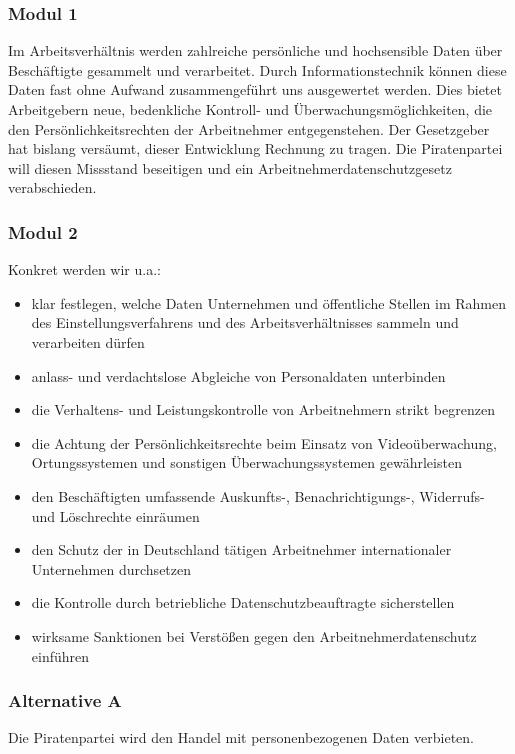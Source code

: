 \label{datenschutz:arbeitnehmer}
\subsubsection{Modul 1}
\abstimmung
Im Arbeitsverhältnis werden zahlreiche persönliche und hochsensible Daten über Beschäftigte gesammelt und verarbeitet. Durch Informationstechnik können diese Daten fast ohne Aufwand zusammengeführt uns ausgewertet werden. Dies bietet Arbeitgebern neue, bedenkliche Kontroll- und Überwachungsmöglichkeiten, die den Persönlichkeitsrechten der Arbeitnehmer entgegenstehen. Der Gesetzgeber hat bislang versäumt, dieser Entwicklung Rechnung zu tragen. Die Piratenpartei will diesen Missstand beseitigen und ein Arbeitnehmerdatenschutzgesetz verabschieden.

\subsubsection{Modul 2}
\abstimmung
Konkret werden wir u.a.:
\begin{itemize}
\item klar festlegen, welche Daten Unternehmen und öffentliche Stellen im Rahmen des Einstellungsverfahrens und des Arbeitsverhältnisses sammeln und verarbeiten dürfen
\item anlass- und verdachtslose Abgleiche von Personaldaten unterbinden
\item die Verhaltens- und Leistungskontrolle von Arbeitnehmern strikt begrenzen
\item die Achtung der Persönlichkeitsrechte beim Einsatz von Videoüberwachung, Ortungssystemen und sonstigen Überwachungssystemen gewährleisten
\item den Beschäftigten umfassende Auskunfts-, Benachrichtigungs-, Widerrufs- und Löschrechte einräumen
\item den Schutz der in Deutschland tätigen Arbeitnehmer internationaler Unternehmen durchsetzen
\item die Kontrolle durch betriebliche Datenschutzbeauftragte sicherstellen
\item wirksame Sanktionen bei Verstößen gegen den Arbeitnehmerdatenschutz einführen
\end{itemize}
 
\subsubsection{Alternative A}
\abstimmung
Die Piratenpartei wird den Handel mit personenbezogenen Daten verbieten.

